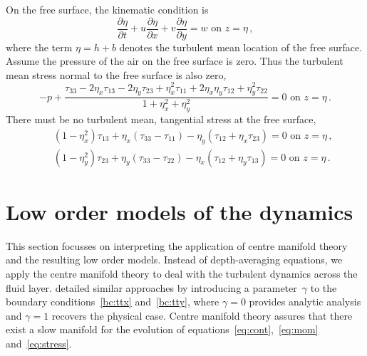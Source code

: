 \documentclass[12pt,a5paper]{article}
\begin{document}
On the free surface, the kinematic condition is 
\begin{equation}
 \frac{\partial\eta}{\partial t}+u\frac{\partial\eta}{\partial x}+v\frac{\partial\eta}{\partial y}=w \text{ on } z=\eta\,,
\end{equation}
where the term $\eta=h+b$ denotes the turbulent mean location of the free surface. Assume the pressure of the air on the free surface is zero. 
Thus the turbulent mean stress normal to the free surface is also zero,
\begin{equation}
    -p+\frac{\tau_{33} -2\eta_x\tau_{13} -2\eta_y\tau_{23}
    +\eta_x^2\tau_{11} +2\eta_x\eta_y\tau_{12}+\eta_y^2\tau_{22}}
    {1+\eta_x^2+\eta_y^2}
     =0  \text{ on }
    z=\eta\,.
    \label{bc:ttz}
\end{equation}
There must be no turbulent mean, tangential stress at the free surface,
\begin{eqnarray}&&
    (1-\eta_x^2)\tau_{13}+\eta_x(\tau_{33}-\tau_{11})-\eta_y(\tau_{12}+\eta_x\tau_{23})=0
   \text{ on } z=\eta\,,
    \label{bc:ttx} \\&&
    (1-\eta_y^2)\tau_{23}+\eta_y(\tau_{33}-\tau_{22})
    -\eta_x(\tau_{12}+\eta_y\tau_{13})=0
   \text{ on }z=\eta\,.
    \label{bc:tty}
\end{eqnarray}




\section{Low order models of the dynamics}
\label{low-order}

This section focusses on interpreting the application of centre manifold theory and the resulting low order models.
Instead of depth-averaging equations, we apply the centre manifold theory to deal with the turbulent dynamics across the fluid layer. 
\cite{Roberts2008,Georgiev2008} detailed similar approaches by introducing a parameter~$\gamma$ to the boundary conditions~\eqref{bc:ttx} and~\eqref{bc:tty}, where $\gamma=0$ provides analytic analysis and $\gamma=1$ recovers the physical case. 
Centre manifold theory assures that there exist a slow manifold for the evolution of equations~\eqref{eq:cont},~\eqref{eq:mom} and~\eqref{eq:stress}.
 
\end{document}
